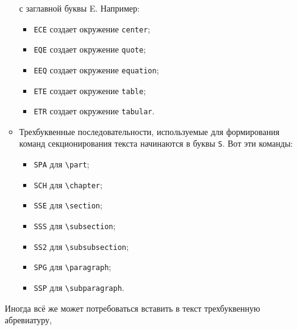 \documentclass[a4paper]{article}
\begin{document}
\begin{itemize}
\begin{itemize}
				с заглавной буквы E. Например:
			  \begin{itemize}
				  \item \texttt{ECE} создает окружение \verb|center|;
				  \item \texttt{EQE} создает окружение \verb|quote|;
				  \item \texttt{EEQ} создает окружение \verb|equation|;
				  \item \texttt{ETE} создает окружение \verb|table|;
				  \item \texttt{ETR} создает окружение \verb|tabular|.
			  \end{itemize}
			\item Трехбуквенные последовательности, используемые для формирования команд
		секционирования текста начинаются в буквы \texttt{S}. Вот эти команды:
				\begin{itemize}
					\item \texttt{SPA} для \verb|\part|;
					\item \texttt{SCH} для \verb|\chapter|;
					\item \texttt{SSE} для \verb|\section|;
					\item \texttt{SSS} для \verb|\subsection|;
					\item \texttt{SS2} для \verb|\subsubsection|;
					\item \texttt{SPG} для \verb|\paragraph|;
					\item \texttt{SSP} для \verb|\subparagraph|.
				\end{itemize}
		\end{itemize}
		Иногда всё же может потребоваться вставить в текст трехбуквенную абревиатуру, 

\end{itemize}
\end{document}
